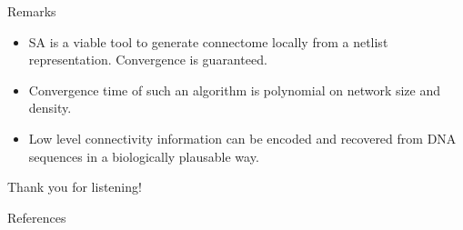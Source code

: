 \documentclass[10pt]{beamer}
\begin{document}
\begin{frame}[fragile]{Remarks}
    \begin{itemize}
        \item SA is a viable tool to generate connectome locally from a netlist
            representation. Convergence is guaranteed.
        \item Convergence time of such an algorithm is polynomial on network
            size and density.
        \item Low level connectivity information can be encoded and recovered
            from DNA sequences in a biologically plausable way.
    \end{itemize}
\end{frame}

\begin{frame}
    Thank you for listening!
\end{frame}

\begin{frame}[allowframebreaks]{References}
  
  
\end{frame}

\appendix
\end{document}

